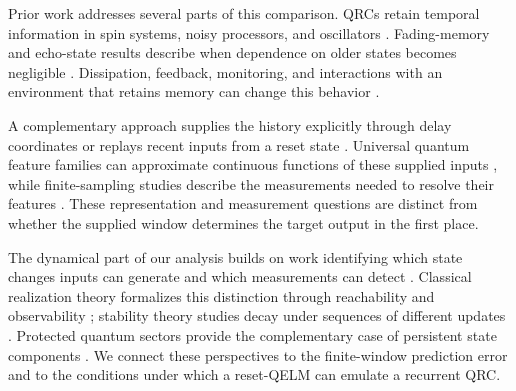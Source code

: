 Prior work addresses several parts of this comparison.  QRCs retain temporal
information in spin systems, noisy processors, and oscillators
\cite{nakajima2019spatial,chen2020temporal,govia2021oscillator,kalfus2022hilbert}.
Fading-memory and echo-state results describe when dependence on older states
becomes negligible \cite{boyd1985fading,grigoryeva2018sas,grigoryeva2018esn,grigoryeva2019differentiable,gonon2021fading,martinezpena2023finite,martinezpena2025input,kobayashi2024esp,kobayashi2026coherence}.
Dissipation, feedback, monitoring, and interactions with an environment that
retains memory can change this behavior
\cite{sannia2024dissipation,kobayashi2024feedback,morguisancho2026monitored,sannia2026nonmarkovian,paparelle2026memory}.

A complementary approach supplies the history explicitly through delay
coordinates or replays recent inputs from a reset state
\cite{kawanabe2026tdqelm,assil2026memory,mujal2023measurement,cindrak2024restriction}.  Universal quantum feature families can approximate
continuous functions of these supplied inputs
\cite{goto2021universal,yu2024nonasymptotic}, while finite-sampling studies
describe the measurements needed to resolve their features
\cite{hu2023sampling,ahmed2025finite}.  These representation and measurement
questions are distinct from whether the supplied window determines the
target output in the first place.

The dynamical part of our analysis builds on work identifying which state
changes inputs can generate and which measurements can detect
\cite{gross2026ptm,cindrak2025krylov,domingo2026diagnosing,keenan2026storage,wang2026fisher}.  Classical realization theory formalizes this distinction
through reachability and observability \cite{petreczky2013realization};
stability theory studies decay under sequences of different updates
\cite{rota1960joint,jungers2009joint,philippe2016constrained}.
Protected quantum sectors provide the complementary case of persistent state
components \cite{zanardi1997noiseless,albert2014symmetries}.
We connect these perspectives to the finite-window prediction error and to
the conditions under which a reset-QELM can emulate a recurrent QRC.
